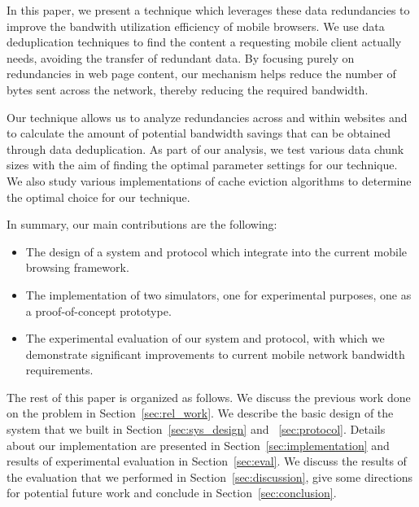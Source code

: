 In this paper, we present a technique which leverages these data redundancies to improve the bandwith utilization efficiency of mobile browsers. We use data deduplication 
techniques to find the content a requesting mobile client actually needs, avoiding the transfer of redundant data. By focusing purely on redundancies in web 
page content, our mechanism helps reduce the number of bytes sent across the network, thereby reducing the required bandwidth.  


Our technique allows us to analyze redundancies across and within websites and to calculate the amount of potential bandwidth savings that can be obtained through data deduplication. As part of our analysis, we test various data chunk sizes with the aim of finding the optimal parameter settings for our technique. We also study various implementations of cache eviction algorithms to determine the optimal choice for our technique. 


In summary, our main contributions are the following:
\begin{itemize}
\item The design of a system and protocol which integrate into the current mobile browsing framework.
\item The implementation of two simulators, one for experimental purposes, one as a proof-of-concept prototype.
\item The experimental evaluation of our system and protocol, with which we demonstrate significant improvements to current mobile network bandwidth requirements.
\end{itemize}

The rest of this paper is organized as follows. We discuss the previous work done on the problem in Section~\ref{sec:rel_work}. We describe the basic design of the 
system that we built in Section~\ref{sec:sys_design} and ~\ref{sec:protocol}. Details about our implementation are presented in Section~\ref{sec:implementation} 
and results of experimental evaluation in Section~\ref{sec:eval}. We discuss the results of the evaluation that we performed in Section~\ref{sec:discussion}, give 
some directions for potential future work and conclude in Section~\ref{sec:conclusion}.
